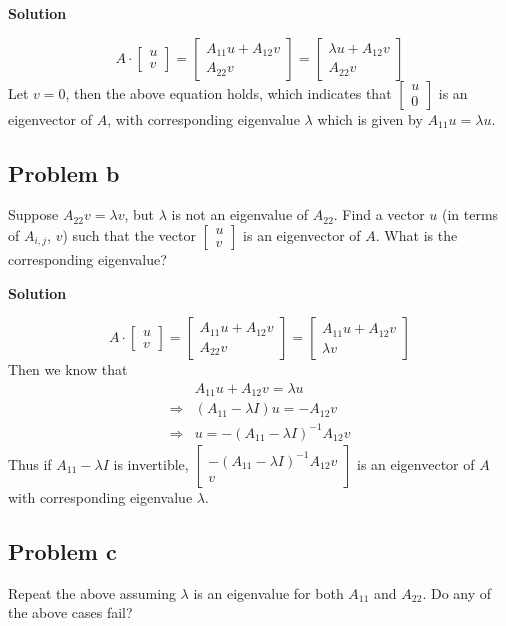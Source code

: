 \documentclass[12pt,oneside,a4paper]{article}
\newcommand{\subproblem}[1]
{
    \subsection*{Problem {#1}}
}
\newcommand{\solution}
{
    \vspace{15pt}
    \noindent\ignorespaces\textbf{\large Solution}\par
}
\begin{document}
\solution
$$A \cdot \begin{bmatrix}u \\ v \end{bmatrix} = \begin{bmatrix} A_{11}u + A_{12}v \\ A_{22}v\end{bmatrix} = \begin{bmatrix} \lambda u + A_{12}v \\ A_{22}v\end{bmatrix}$$
Let $v = 0$, then the above equation holds, which indicates that $\begin{bmatrix}u \\ 0 \end{bmatrix}$ is an eigenvector of $A$, with corresponding eigenvalue $\lambda$ which is given by $A_{11}u = \lambda u$.

\subproblem{b}
Suppose $A_{22}v = \lambda v$, but $\lambda$ is not an eigenvalue of $A_{22}$. Find a vector $u$ (in terms of $A_{i,j}$, $v$) such that the vector $\begin{bmatrix} u \\ v\end{bmatrix}$ is an eigenvector of $A$. What is the corresponding eigenvalue?

\solution
$$A \cdot \begin{bmatrix}u \\ v \end{bmatrix} = \begin{bmatrix} A_{11}u + A_{12}v \\ A_{22}v\end{bmatrix} = \begin{bmatrix} A_{11}u + A_{12}v \\ \lambda v\end{bmatrix}$$
Then we know that
$$
\begin{aligned}
&A_{11}u + A_{12}v = \lambda u\\
\Rightarrow &(A_{11} - \lambda I)u = -A_{12}v\\
\Rightarrow &u = -(A_{11} - \lambda I)^{-1}A_{12}v
\end{aligned}
$$
Thus if $A_{11} - \lambda I$ is invertible, $\begin{bmatrix}-(A_{11} - \lambda I)^{-1}A_{12}v \\v \end{bmatrix}$ is an eigenvector of $A$ with corresponding eigenvalue $\lambda$.

\subproblem{c}
Repeat the above assuming $\lambda$ is an eigenvalue for both $A_{11}$ and $A_{22}$. Do any of the above cases fail?
\end{document}
